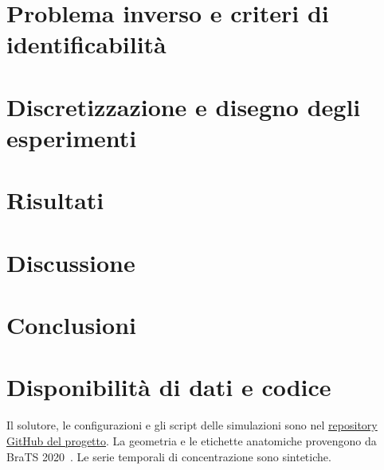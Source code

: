 \documentclass[10pt,a4paper]{article}
\begin{document}
\section{Problema inverso e criteri di identificabilità}
\label{sec:inverse}


\section{Discretizzazione e disegno degli esperimenti}
\label{sec:numerics}


\section{Risultati}
\label{sec:results}

\FloatBarrier

\section{Discussione}
\label{sec:discussion}


\section{Conclusioni}
\label{sec:conclusions}


\FloatBarrier
\section*{Disponibilità di dati e codice}
Il solutore, le configurazioni e gli script delle simulazioni sono nel \href{https://github.com/GiovanniIacuzzo/Fractional-Poro-Viscoelastic}{repository GitHub del progetto}. La geometria e le etichette anatomiche provengono da BraTS 2020~\citep{brats2020protocol}. Le serie temporali di concentrazione sono sintetiche.

\clearpage
\appendix
\renewcommand{\thefigure}{\thesection.\arabic{figure}}
\renewcommand{\thetable}{\thesection.\arabic{table}}
\renewcommand{\theequation}{\thesection.\arabic{equation}}
\renewcommand{\theHfigure}{app.\thesection.\arabic{figure}}
\renewcommand{\theHtable}{app.\thesection.\arabic{table}}
\renewcommand{\theHequation}{app.\thesection.\arabic{equation}}

\FloatBarrier

\FloatBarrier

\renewcommand{\bibsection}{\section*{Riferimenti bibliografici}}
\setlength{\bibsep}{3pt plus 1pt minus 1pt}


\end{document}
